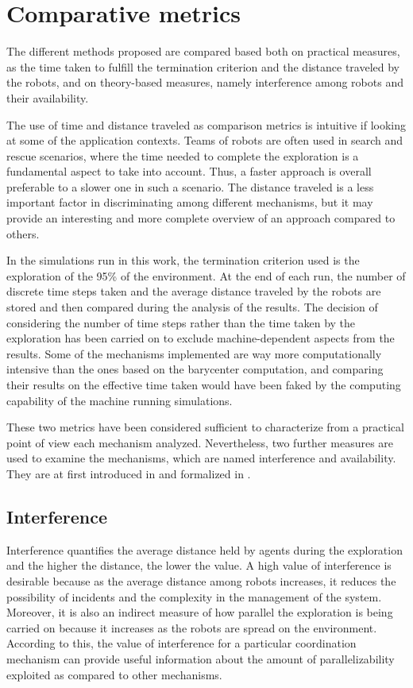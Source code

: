 \section{Comparative metrics}

The different methods proposed are compared based both on practical
measures, as the time taken to fulfill the termination criterion and
the distance traveled by the robots, and on theory-based measures,
namely interference among robots and their availability. 

The use of time and distance traveled as comparison metrics is intuitive
if looking at some of the application contexts. Teams of robots are
often used in search and rescue scenarios, where the time needed to
complete the exploration is a fundamental aspect to take into account.
Thus, a faster approach is overall preferable to a slower one in such
a scenario. The distance traveled is a less important factor in discriminating
among different mechanisms, but it may provide an interesting and
more complete overview of an approach compared to others. 

In the simulations run in this work, the termination criterion used
is the exploration of the 95\% of the environment. At the end of each
run, the number of discrete time steps taken and the average distance
traveled by the robots are stored and then compared during the analysis
of the results. The decision of considering the number of time steps
rather than the time taken by the exploration has been carried on
to exclude machine-dependent aspects from the results. Some of the
mechanisms implemented are way more computationally intensive than
the ones based on the barycenter computation, and comparing their
results on the effective time taken would have been faked by the computing
capability of the machine running simulations. 

These two metrics have been considered sufficient to characterize
from a practical point of view each mechanism analyzed. Nevertheless,
two further measures are used to examine the mechanisms, which are
named interference and availability. They are at first introduced
in \cite{Rogers2013} and formalized in \cite{Cattaneo2017}. 

\subsection{Interference }

Interference quantifies the average distance held by agents during
the exploration and the higher the distance, the lower the value.
A high value of interference is desirable because as the average distance
among robots increases, it reduces the possibility of incidents and
the complexity in the management of the system. Moreover, it is also
an indirect measure of how parallel the exploration is being carried
on because it increases as the robots are spread on the environment.
According to this, the value of interference for a particular coordination
mechanism can provide useful information about the amount of parallelizability
exploited as compared to other mechanisms.

